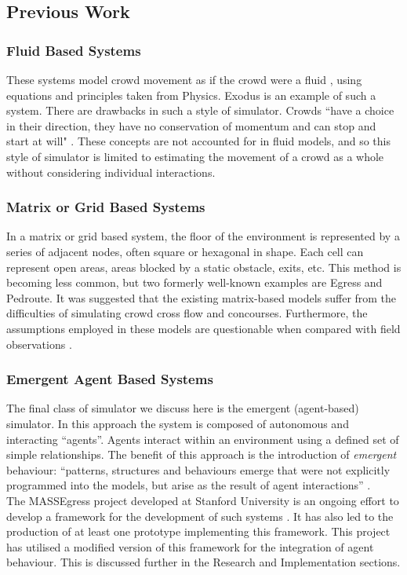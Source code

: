 \subsection{Previous Work}

\subsubsection{Fluid Based Systems}
These systems model crowd movement as if the crowd were a fluid \cite{WikipediaFluidMechanics}, using equations and principles taken from Physics. 
Exodus \cite{GaleaNumericalSimulation,GaleaMathModelling} is an example of such a system. There are drawbacks in such a style 
of simulator. Crowds ``have a choice in their direction, they have no conservation of momentum and can stop and start at will" \cite{StillCrowdDynamics}. 
These concepts are not accounted for in fluid models, and so this style of simulator is limited to estimating the movement of a crowd as a whole without
considering individual interactions.

\subsubsection{Matrix or Grid Based Systems}
In a matrix or grid based system, the floor of the environment is represented by a series of adjacent nodes, often square or hexagonal in shape. Each 
cell can represent open areas, areas blocked by a static obstacle, exits, etc. This method is becoming less common, but two formerly well-known examples are 
Egress and Pedroute. It was suggested that the existing matrix-based models suffer from the
difficulties of simulating crowd cross flow and concourses. Furthermore, the
assumptions employed in these models are questionable when compared with field observations \cite{StillCrowdDynamics}.

\subsubsection{Emergent Agent Based Systems}
The final class of simulator we discuss here is the emergent (agent-based) simulator. In this approach the system is composed of autonomous
and interacting ``agents''. Agents interact within an environment using a defined set of simple relationships. The benefit of this approach is the introduction
of \emph{emergent} behaviour: ``patterns, structures and behaviours emerge that were not explicitly programmed into the models, but arise as the 
result of agent interactions'' \cite{AgentBasedTutorial}.\\
The MASSEgress project developed at Stanford University is an ongoing effort to develop a framework for the development of such systems \cite{MultiAgentFramework}.
It has also led to the production of at least one prototype implementing this framework. 
This project has utilised a modified version of this framework for the integration
of agent behaviour. This is discussed further in the Research and Implementation sections.


